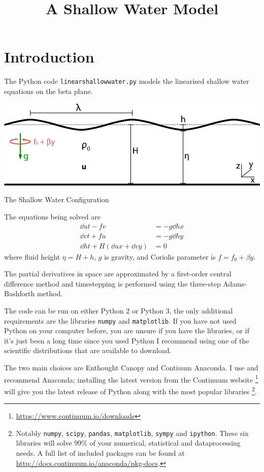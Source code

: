 \documentclass[a4paper, sfsidenotes, twoside]{tufte-handout}
\title{A Shallow Water Model}
\begin{document}
  \section{Introduction}
  \label{sec:Introduction}

  The Python code \texttt{linearshallowwater.py} models the linearised shallow
  water equations on the beta plane.
  \begin{marginfigure}[1in]
    \includegraphics{shallow_water}
    \caption{The Shallow Water Configuration}
    \label{fig:shallow}
  \end{marginfigure}
  The equations being solved are
  \begin{subequations}
    \label{eqn:sw}
    \begin{align}
      \dd{u}{t} - fv &= - g \dd{h}{x} \\
      \dd{v}{t} + fu &= - g \dd{h}{y} \\
      \dd{h}{t} + H(\dd{u}{x} + \dd{v}{y}) &= 0
    \end{align}
  \end{subequations}
  where fluid height $\eta = H + h$, $g$ is gravity, and Coriolis parameter is $f=f_0 + \beta y$.

  The partial derivatives in space are approximated by a first-order central
  difference method and timestepping is performed using the three-step Adams-Bashforth method.

  The code can be run on either Python 2 or Python 3, the only additional requirements are the libraries \texttt{numpy} and \texttt{matplotlib}.
  If you have not used Python on your computer before, you are unsure if you have the libraries, or if it's just been a long time since you used Python I recommend using one of the scientific distributions that are available to download.

  The two main choices are Enthought Canopy and Contiuum Anaconda.
  I use and recommend Anaconda; installing the latest version from the Continuum website \footnote{\url{https://www.continuum.io/downloads}} will give you the latest release of Python along with the most popular libraries \footnote{Notably \texttt{numpy}, \texttt{scipy}, \texttt{pandas}, \texttt{matplotlib}, \texttt{sympy} and \texttt{ipython}.  These six libraries will solve 99\% of your numerical, statistical and dataprocessing needs.
  A full list of included packages can be found at \url{http://docs.continuum.io/anaconda/pkg-docs}.}.
\end{document}
